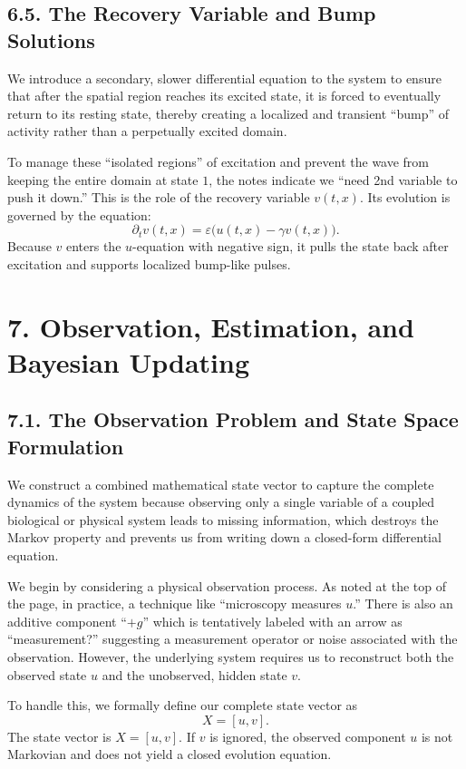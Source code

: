 \documentclass[11pt]{article}
\theoremstyle{definition}
\theoremstyle{remark}
\begin{document}
\subsection*{6.5. The Recovery Variable and Bump Solutions}
We introduce a secondary, slower differential equation to the system to ensure that after the spatial region reaches its excited state, it is forced to eventually return to its resting state, thereby creating a localized and transient ``bump'' of activity rather than a perpetually excited domain.

To manage these ``isolated regions'' of excitation and prevent the wave from keeping the entire domain at state $1$, the notes indicate we ``need 2nd variable to push it down.'' This is the role of the recovery variable $v(t,x)$. Its evolution is governed by the equation:
\[
\partial_t v(t,x)=\varepsilon\bigl(u(t,x)-\gamma v(t,x)\bigr).
\]
Because $v$ enters the $u$-equation with negative sign, it pulls the state back after excitation and supports localized bump-like pulses.


\section*{7. Observation, Estimation, and Bayesian Updating}
\subsection*{7.1. The Observation Problem and State Space Formulation}
We construct a combined mathematical state vector to capture the complete dynamics of the system because observing only a single variable of a coupled biological or physical system leads to missing information, which destroys the Markov property and prevents us from writing down a closed-form differential equation.

We begin by considering a physical observation process. As noted at the top of the page, in practice, a technique like ``microscopy measures $u$.'' There is also an additive component ``$+g$'' which is tentatively labeled with an arrow as ``measurement?'' suggesting a measurement operator or noise associated with the observation. However, the underlying system requires us to reconstruct both the observed state $u$ and the unobserved, hidden state $v$.

To handle this, we formally define our complete state vector as
\[
X=[u,v].
\]
The state vector is $X=[u,v]$. If $v$ is ignored, the observed component $u$ is not Markovian and does not yield a closed evolution equation.
\end{document}
